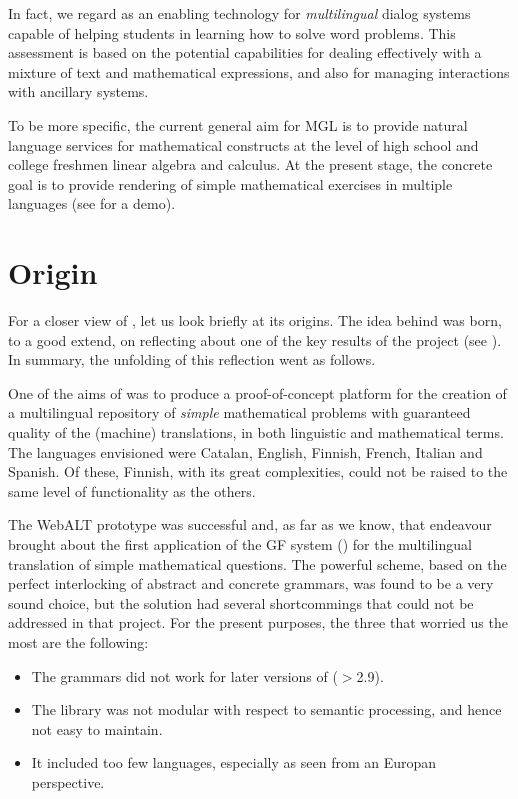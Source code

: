 \documentclass[submission,copyright,creativecommons]{eptcs}
\begin{document}
In fact, we regard \MGL{} as an enabling technology for \emph{multilingual}
dialog systems capable of helping students in learning how to solve word
problems.  This assessment is based on the \MGL{} potential capabilities
for dealing effectively with a mixture of text and mathematical
expressions, and also for managing interactions with ancillary \CAS{}
systems.

To be more specific, the current general aim for MGL is to provide natural
language services for mathematical constructs at the level of high school
and college freshmen linear algebra and calculus.  At the present stage,
the concrete goal is to provide rendering of simple mathematical exercises
in multiple languages (see \cite{MathBar} for a demo).



\section{Origin}

For a closer view of \MGL, let us look briefly at its origins.  The
idea behind \MGL{} was born, to a good extend, on reflecting about one of
the key results of the \webalt{} project (see
\cite{Caprotti_multilingualdelivery, Caprotti06webalt!deliver}).  In
summary, the unfolding of this reflection went as follows.

One of the aims of \webalt{} was to produce a proof-of-concept
platform for the creation of a multilingual repository of \emph{simple}
mathematical problems with guaranteed quality of the (machine)
translations, in both linguistic and mathematical terms. The languages
envisioned were Catalan,
English,
Finnish,
French,
Italian and
Spanish.
Of these, Finnish, with its great complexities, could not be raised to
the same level of functionality as the others.

The WebALT prototype was successful and, as far as we know, that endeavour
brought about the first application of the GF system (\cite{GF,Ranta11})
for the multilingual translation of simple mathematical questions.  The
powerful \GF{} scheme, based on the perfect interlocking of abstract and
concrete grammars, was found to be a very sound choice, but the solution
had several shortcommings that could not be addressed in that project.
For the present purposes, the three that worried us the most are the
following:
\begin{itemize}
\item
The grammars did not work for later versions of \GF{} ($>$2.9).
\item
The library was not modular with respect to
semantic processing, and hence not easy to maintain.
\item
It included too few languages, especially as seen from an Europan
perspective.
\end{itemize}
\end{document}
